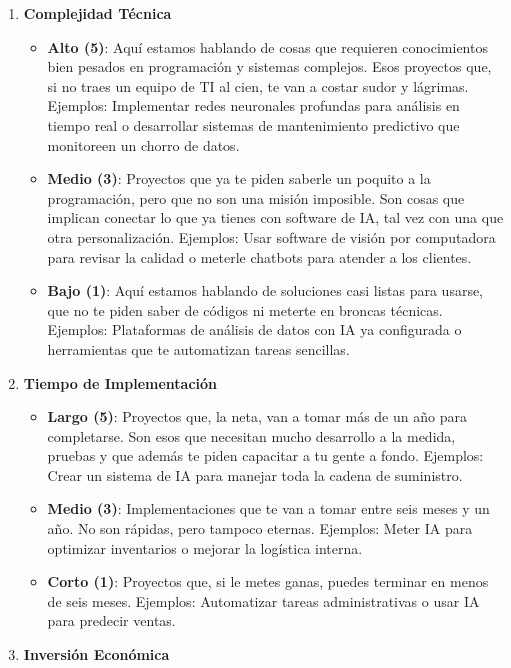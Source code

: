 \documentclass[
  10pt,
  letterpaper,
]{book}
\providecommand{\tightlist}{%
  \setlength{\itemsep}{0pt}\setlength{\parskip}{0pt}}\usepackage{longtable,booktabs,array}
\begin{document}
\begin{enumerate}
\def\labelenumi{\arabic{enumi}.}
\tightlist
\item
  \textbf{Complejidad Técnica}

  \begin{itemize}
  \tightlist
  \item
    \textbf{Alto (5)}: Aquí estamos hablando de cosas que requieren
    conocimientos bien pesados en programación y sistemas complejos.
    Esos proyectos que, si no traes un equipo de TI al cien, te van a
    costar sudor y lágrimas. Ejemplos: Implementar redes neuronales
    profundas para análisis en tiempo real o desarrollar sistemas de
    mantenimiento predictivo que monitoreen un chorro de datos.
  \item
    \textbf{Medio (3)}: Proyectos que ya te piden saberle un poquito a
    la programación, pero que no son una misión imposible. Son cosas que
    implican conectar lo que ya tienes con software de IA, tal vez con
    una que otra personalización. Ejemplos: Usar software de visión por
    computadora para revisar la calidad o meterle chatbots para atender
    a los clientes.
  \item
    \textbf{Bajo (1)}: Aquí estamos hablando de soluciones casi listas
    para usarse, que no te piden saber de códigos ni meterte en broncas
    técnicas. Ejemplos: Plataformas de análisis de datos con IA ya
    configurada o herramientas que te automatizan tareas sencillas.
  \end{itemize}
\item
  \textbf{Tiempo de Implementación}

  \begin{itemize}
  \tightlist
  \item
    \textbf{Largo (5)}: Proyectos que, la neta, van a tomar más de un
    año para completarse. Son esos que necesitan mucho desarrollo a la
    medida, pruebas y que además te piden capacitar a tu gente a fondo.
    Ejemplos: Crear un sistema de IA para manejar toda la cadena de
    suministro.
  \item
    \textbf{Medio (3)}: Implementaciones que te van a tomar entre seis
    meses y un año. No son rápidas, pero tampoco eternas. Ejemplos:
    Meter IA para optimizar inventarios o mejorar la logística interna.
  \item
    \textbf{Corto (1)}: Proyectos que, si le metes ganas, puedes
    terminar en menos de seis meses. Ejemplos: Automatizar tareas
    administrativas o usar IA para predecir ventas.
  \end{itemize}
\item
  \textbf{Inversión Económica}


\end{enumerate}
\end{document}
